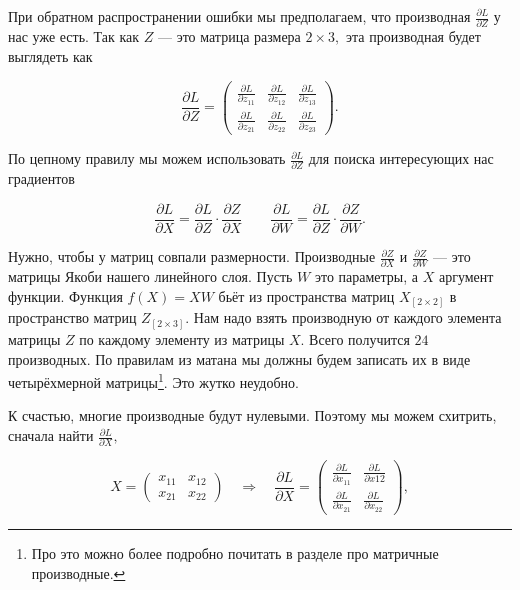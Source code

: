 \begin{sol} 
При обратном распространении ошибки мы предполагаем, что производная $\frac{\partial L}{\partial Z}$ у нас уже есть. Так как $Z$ --- это матрица размера $2 \times 3,$ эта производная будет выглядеть как 

\[
\frac{\partial L}{\partial Z} = \begin{pmatrix} \frac{\partial L}{\partial z_{11}}  & \frac{\partial L}{\partial z_{12}} & \frac{\partial L}{\partial z_{13}} \\ \frac{\partial L}{\partial z_{21}}  & \frac{\partial L}{\partial z_{22}} & \frac{\partial L}{\partial z_{23}}  \end{pmatrix}.
\]

По цепному правилу мы можем использовать $\frac{\partial L}{\partial Z}$ для поиска интересующих нас градиентов 

\[
\frac{\partial L}{\partial X} = \frac{\partial L}{\partial Z} \cdot \frac{\partial Z}{\partial X} \qquad  \frac{\partial L}{\partial W} = \frac{\partial L}{\partial Z} \cdot \frac{\partial Z}{\partial W}.
\]

Нужно, чтобы у матриц совпали размерности. Производные $\frac{\partial Z}{\partial X}$ и $\frac{\partial Z}{\partial W}$ --- это матрицы Якоби нашего линейного слоя. Пусть $W$ это параметры, а $X$ аргумент функции. Функция $f(X) = XW$ бьёт из пространства матриц $X_{[2 \times 2]}$ в пространство матриц $Z_{[2 \times 3]}$. Нам надо взять производную от каждого элемента матрицы $Z$ по каждому элементу из матрицы $X$. Всего получится $24$ производных. По правилам из матана мы должны будем записать их в виде четырёхмерной матрицы\footnote{Про это можно более подробно почитать в разделе про матричные производные.}. Это жутко неудобно. 

К счастью, многие производные будут нулевыми. Поэтому мы можем схитрить, сначала найти $\frac{\partial L}{\partial X},$ 

\[ 
    X = \begin{pmatrix} x_{11} & x_{12} \\  x_{21} & x_{22}  \end{pmatrix} \quad \Rightarrow \quad  \frac{\partial L}{\partial X} = \begin{pmatrix} \frac{\partial L}{\partial x_{11}}  & \frac{\partial L}{\partial x{12}} \\ \frac{\partial L}{\partial x_{21}}  & \frac{\partial L}{\partial x_{22}}   \end{pmatrix},
\]


\end{sol}
